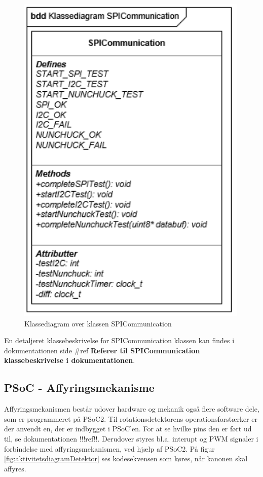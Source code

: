 \begin{figure}[H]
	\centering
	\includegraphics[]{DesignOgImplementering/images/SPICommunication}
	\caption{Klassediagram over klassen SPICommunication}
	\label{figure:KlassediagramSPICommunication}
\end{figure}

En detaljeret klassebeskrivelse for SPICommunication klassen kan findes i dokumentationen side \#ref \textbf{Referer til SPICommunication klassebeskrivelse i dokumentationen}.

\subsection{PSoC - Affyringsmekanisme}
 
Affyringsmekanismen består udover hardware og mekanik også flere software dele, som er programmeret på PSoC2. Til rotationsdetektorens operationsforstærker er der anvendt en, der er indbygget i PSoC'en. For at se hvilke pins den er ført ud til, se dokumentationen !!!ref!!. Derudover styres bl.a. interupt og PWM signaler i forbindelse med affyringsmekanismen, ved hjælp af PSoC2.
På figur \ref{fig:aktivitetsdiagramDetektor} ses kodesekvensen som køres, når kanonen skal affyres. 
 
